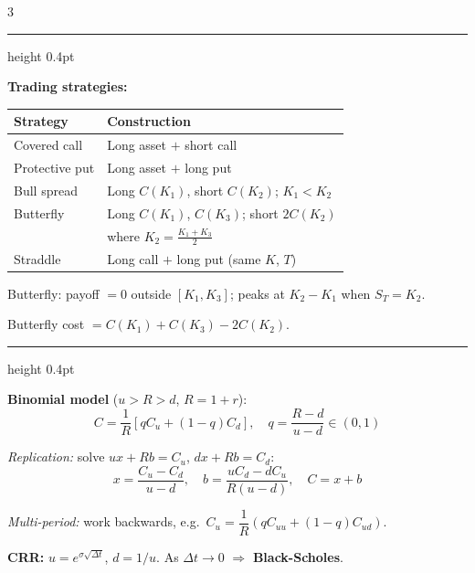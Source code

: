 \documentclass[9pt, a4paper, landscape]{extarticle}
\newcommand{\boxrule}{\vspace{3pt}\textcolor{ruleclr}{\hrule height 0.4pt}\vspace{3pt}}
\begin{document}
\begin{multicols}{3}
{\boxrule

\textbf{Trading strategies:}

\begin{tabular}{@{}ll@{}}
  \toprule
  Strategy & Construction \\
  \midrule
  Covered call   & Long asset $+$ short call \\[2pt]
  Protective put & Long asset $+$ long put \\[2pt]
  Bull spread    & Long $C(K_1)$, short $C(K_2)$;\; $K_1<K_2$ \\[2pt]
  Butterfly      & Long $C(K_1)$, $C(K_3)$; short $2C(K_2)$ \\
                 & \quad where $K_2=\tfrac{K_1+K_3}{2}$ \\[2pt]
  Straddle       & Long call $+$ long put (same $K$, $T$) \\
  \bottomrule
\end{tabular}

\smallskip
Butterfly: payoff $=0$ outside $[K_1,K_3]$; peaks at $K_2-K_1$ when $S_T=K_2$.

Butterfly cost $= C(K_1)+C(K_3)-2C(K_2)$.

\boxrule

\textbf{Binomial model} ($u > R > d$,\; $R = 1+r$):
\[
C=\frac{1}{R}[qC_u+(1-q)C_d],\quad q=\frac{R-d}{u-d}\in(0,1)
\]

\textit{Replication:} solve $ux+Rb=C_u$,\; $dx+Rb=C_d$:
\[
x=\frac{C_u-C_d}{u-d},\quad b=\frac{uC_d-dC_u}{R(u-d)},\quad C=x+b
\]

\textit{Multi-period:} work backwards, e.g.\
$C_u=\dfrac{1}{R}(qC_{uu}+(1-q)C_{ud})$.

\textbf{CRR:}\; $u=e^{\sigma\sqrt{\Delta t}}$,\; $d=1/u$.
As $\Delta t\to 0$ $\Rightarrow$ \textbf{Black-Scholes}.
}

\end{multicols}
\end{document}
